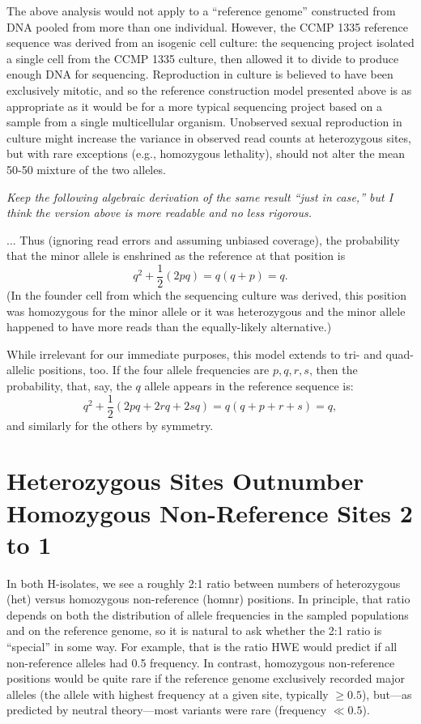 \documentclass{article}\usepackage[]{graphicx}\usepackage[]{color}
\begin{document}
The above analysis would not apply to a ``reference genome'' constructed from DNA pooled from more 
than one individual. %
However, the CCMP 1335 reference sequence\cite{Armbrust04} 
was derived from an isogenic cell culture: the sequencing project isolated a single cell from the 
CCMP 1335 culture, then allowed it to divide to produce enough DNA for sequencing.  Reproduction in
culture is believed to have been exclusively mitotic, and so the reference construction model 
presented above is as appropriate as it would be for a more typical sequencing project based on a 
sample from a single multicellular organism.  Unobserved sexual reproduction in culture might 
increase the variance in observed read counts at heterozygous sites, but with rare exceptions 
(e.g., homozygous lethality), should not alter the mean 50-50 mixture of the two alleles. 

\newif\ifshowalgebra\showalgebratrue
\ifshowalgebra
{\footnotesize \textit{ Keep the following algebraic derivation of the same result 
``just in case,'' but \ifshort\else commented out in methods, since \fi I think the version above
is more readable and no less rigorous.}

\noindent
... Thus (ignoring read errors and assuming unbiased coverage), the probability that the minor
allele is enshrined as the reference at that position is
$$
  q^2 + \frac12(2 p q) = q(q + p) = q .
$$
(In the founder cell from which the sequencing culture was derived, this position was homozygous for
the minor allele or it was heterozygous and the minor allele happened to have more reads than the
equally-likely alternative.)  

While irrelevant for our immediate purposes, this model extends to tri- and quad-allelic positions, 
too.  If the four allele frequencies are $p,q,r,s$, then the probability, that, say, the $q$ allele
appears in the reference sequence is:
$$
  q^2 + \frac12(2 p q + 2 r q + 2 s q) = q(q + p + r + s) = q ,
$$
and similarly for the others by symmetry.
}
\fi

\section{Heterozygous Sites Outnumber Homozygous Non-Reference Sites 2 to 1}
\label{sec:two-to-one}

In both H-isolates, we see a roughly 2:1 ratio between numbers of
heterozygous (het) versus homozygous non-reference (homnr) positions.  In
principle, that ratio depends on both the distribution of allele
frequencies in the sampled populations and on the reference genome, so
it is natural to ask whether the 2:1 ratio is ``special'' in some way.
For example, that is the ratio HWE would predict if all non-reference
alleles had 0.5 frequency.  In contrast, homozygous non-reference positions would be quite
rare if the reference genome exclusively recorded major alleles 
(the allele with highest frequency at a given site, typically $\ge 0.5$), but---as predicted by neutral theory---most 
variants were rare (frequency $\ll 0.5$).  
\end{document}

